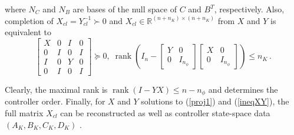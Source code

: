 \documentclass[12pt, a4paper,reqno]{amsart}
\theoremstyle{definition}
\begin{document}
where $N_C$ and $N_B$ are bases of the null space of $C$ and $B^T$, respectively. Also, completion of $X_{cl} = Y_{cl}^{-1} \succ 0$ and 
$X_{cl} \in \mathbb R^{(n+n_K)\times (n+n_K)}$ from $X$ and $Y$ is equivalent to \cite{packard1991collection,gahinet1994linear}
\begin{equation}\label{ineqXY}\begin{bmatrix}X & 0 &I & 0 \\0 & I & 0 & I \\I & 0 & Y&0 \\0 & I &0 & I \end{bmatrix} \succeq 0, \; \operatorname{rank} \left(I_{n} - \begin{bmatrix}Y & 0 \\0 & I_{n_\phi} \end{bmatrix} \begin{bmatrix}X & 0 \\0 & I_{n_\phi} \end{bmatrix}\right) \leq n_K\,.\end{equation}


Clearly, the maximal rank is $\operatorname{rank} (I-YX) \leq n-n_\phi$ and determines the controller order. Finally, for $X$ and $Y$ solutions to  (\ref{proj1}) and (\ref{ineqXY}), the full matrix $X_{cl}$ can be reconstructed as well as controller state-space data $(A_K,B_K,C_K,D_K)$ \cite{gahinet1994linear}.


%
%
\end{document}
